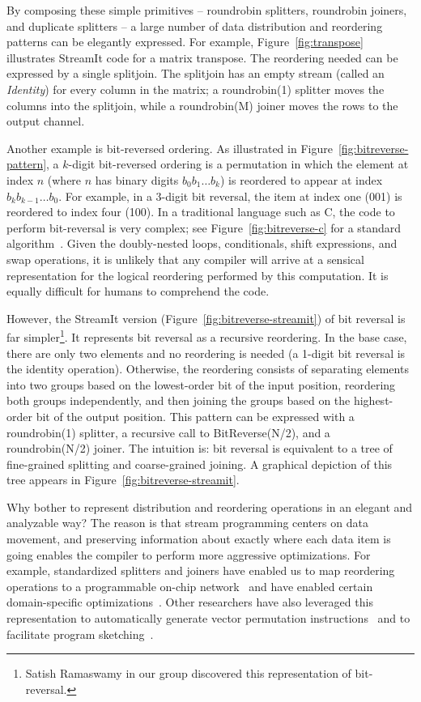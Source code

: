 By composing these simple primitives -- roundrobin splitters,
roundrobin joiners, and duplicate splitters -- a large number of data
distribution and reordering patterns can be elegantly expressed.  For
example, Figure~\ref{fig:transpose} illustrates StreamIt code for a
matrix transpose.  The reordering needed can be expressed by a single
splitjoin.  The splitjoin has an empty stream (called an {\it
Identity}) for every column in the matrix; a roundrobin(1) splitter
moves the columns into the splitjoin, while a roundrobin(M) joiner
moves the rows to the output channel.

Another example is bit-reversed ordering.  As illustrated in
Figure~\ref{fig:bitreverse-pattern}, a $k$-digit bit-reversed ordering
is a permutation in which the element at index $n$ (where $n$ has
binary digits $b_0b_1 \dots b_k$) is reordered to appear at index
$b_kb_{k-1} \dots b_0$.  For example, in a 3-digit bit reversal, the
item at index one (001) is reordered to index four (100).  In a
traditional language such as C, the code to perform bit-reversal is
very complex; see Figure~\ref{fig:bitreverse-c} for a standard
algorithm~\cite{press_numerical_1992}.  Given the doubly-nested loops,
conditionals, shift expressions, and swap operations, it is unlikely
that any compiler will arrive at a sensical representation for the
logical reordering performed by this computation.  It is equally
difficult for humans to comprehend the code.

However, the StreamIt version (Figure~\ref{fig:bitreverse-streamit})
of bit reversal is far simpler\footnote{Satish Ramaswamy in our group
discovered this representation of bit-reversal.}.  It represents bit
reversal as a recursive reordering.  In the base case, there are only
two elements and no reordering is needed (a 1-digit bit reversal is
the identity operation).  Otherwise, the reordering consists of
separating elements into two groups based on the lowest-order bit of
the input position, reordering both groups independently, and then
joining the groups based on the highest-order bit of the output
position.  This pattern can be expressed with a roundrobin(1)
splitter, a recursive call to BitReverse(N/2), and a roundrobin(N/2)
joiner.  The intuition is: bit reversal is equivalent to a tree of
fine-grained splitting and coarse-grained joining.  A graphical
depiction of this tree appears in
Figure~\ref{fig:bitreverse-streamit}.

Why bother to represent distribution and reordering operations in an
elegant and analyzable way?  The reason is that stream programming
centers on data movement, and preserving information about exactly
where each data item is going enables the compiler to perform more
aggressive optimizations.  For example, standardized splitters and
joiners have enabled us to map reordering operations to a programmable
on-chip network~\cite{gordon-asplos02} and have enabled certain
domain-specific
optimizations~\cite{lamb-pldi03,agrawal-cases05,thies07compression}.
Other researchers have also leveraged this representation to
automatically generate vector permutation
instructions~\cite{mani-permutations} and to facilitate program
sketching~\cite{bit-streaming}.

